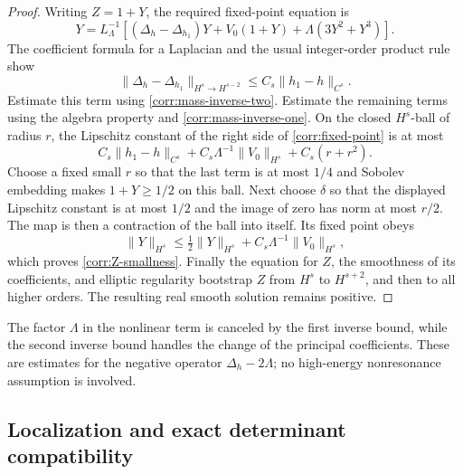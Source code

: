 \begin{proof}
Writing \(Z=1+Y\), the required fixed-point equation is
\begin{equation}\label{corr:fixed-point}
 Y=L_\Lambda^{-1}\left[
    (\Delta_h-\Delta_{h_1})Y+V_0(1+Y)
                            +\Lambda(3Y^2+Y^3)\right].
\end{equation}
The coefficient formula for a Laplacian and the usual integer-order
product rule show
\[
 \|\Delta_h-\Delta_{h_1}\|_{H^s\to H^{s-2}}
                         \le C_s\|h_1-h\|_{C^s}.
\]
Estimate this term using \eqref{corr:mass-inverse-two}.  Estimate the
remaining terms using the algebra property and
\eqref{corr:mass-inverse-one}.  On the closed \(H^s\)-ball of radius
\(r\), the Lipschitz constant of the right side of
\eqref{corr:fixed-point} is at most
\[
 C_s\|h_1-h\|_{C^s}
   +C_s\Lambda^{-1}\|V_0\|_{H^s}+C_s(r+r^2).
\]
Choose a fixed small \(r\) so that the last term is at most \(1/4\)
and Sobolev embedding makes \(1+Y\ge1/2\) on this ball.  Next choose
\(\delta\) so that the displayed Lipschitz constant is at most
\(1/2\) and the image of zero has norm at most \(r/2\).  The map is
then a contraction of the ball into itself.  Its fixed point obeys
\[
 \|Y\|_{H^s}
 \le\tfrac12\|Y\|_{H^s}
                 +C_s\Lambda^{-1}\|V_0\|_{H^s},
\]
which proves \eqref{corr:Z-smallness}.  Finally the equation for
\(Z\), the smoothness of its coefficients, and elliptic regularity
bootstrap \(Z\) from \(H^s\) to \(H^{s+2}\), and then to all higher
orders.  The resulting real smooth solution remains positive.
\end{proof}

The factor \(\Lambda\) in the nonlinear term is canceled by the first
inverse bound, while the second inverse bound handles the change of
the principal coefficients.  These are estimates for the negative
operator \(\Delta_h-2\Lambda\); no high-energy nonresonance assumption
is involved.

\subsection{Localization and exact determinant compatibility}

